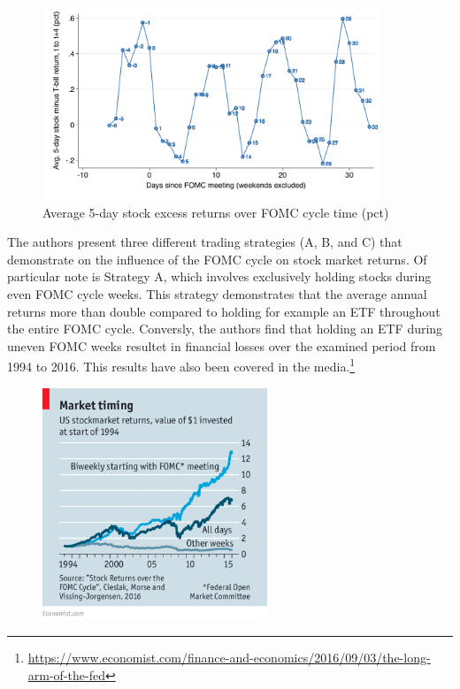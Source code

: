 \begin{figure}[h]
    \centering
    \label{cies19_fig1}
    \includegraphics[width=0.9\textwidth]{figures/cies19/fig1}
    \caption{Average 5-day stock excess returns over FOMC cycle time (pct) \parencite{cieslak_stock_2019} }
\end{figure}

The authors present three different trading strategies (A, B, and C) that demonstrate on the influence of the FOMC cycle on stock market returns.  Of particular note is Strategy A, which involves exclusively holding stocks during even FOMC cycle weeks. This strategy demonstrates that the average annual returns more than double compared to holding for example an ETF throughout the entire FOMC cycle.  Conversly, the authors find that holding an ETF during uneven FOMC weeks resultet in financial losses over the examined period from 1994 to 2016.  This results have also been covered in the media.\footnote{\url{https://www.economist.com/finance-and-economics/2016/09/03/the-long-arm-of-the-fed}}

\begin{figure}[h]
    \centering
     \label{FED_long_arm}
    \includegraphics[width=0.6\textwidth]{figures/20160903_FNC453.png}
    \caption{\cite{noauthor_long_2016}}
\end{figure}

